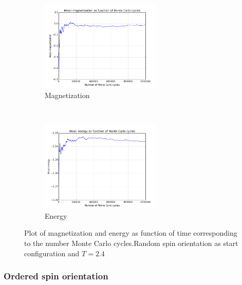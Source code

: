 \documentclass{article}
\begin{document}
\begin{figure}[t!]
    \centering
    \begin{subfigure}[t]{0.6\textwidth}
        \centering
        \includegraphics[height=1.7in]{4cmagnetisationrandom24.png}
        \caption{Magnetization}
    \end{subfigure}%
    ~ 
    \begin{subfigure}[t]{0.6\textwidth}
        \centering
        \includegraphics[height=1.7in]{4cenergyrandom24.png}
        \caption{Energy}
    \end{subfigure}
    \caption{Plot of magnetization and energy as function of time corresponding to the number Monte Carlo cycles.Random spin orientation as start configuration and $T = 2.4$}
\end{figure}


\subsubsection*{Ordered spin orientation}
\end{document}
